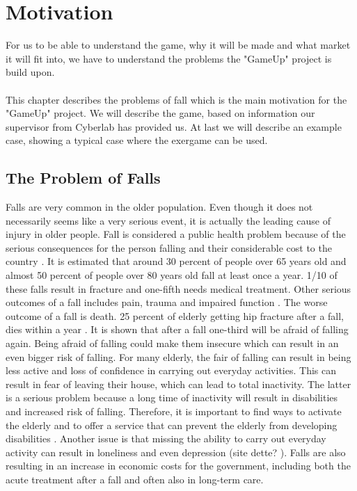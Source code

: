 \chapter{Motivation}
For us to be able to understand the game, why it will be made and what market it will fit into, we have to understand the problems the "GameUp" project is build upon.  \\ \\
This chapter describes the problems of fall which is the main motivation for the "GameUp" project. We will describe the game, based on information our supervisor from Cyberlab has provided us. At last we will describe an example case, showing a typical case where the exergame can be used. 
\section{The Problem of Falls}
Falls are very common in the older population. Even though it does not necessarily seems like a very serious event, it is actually the leading cause of injury in older people.  Fall is considered a public health problem because of the serious consequences for the person falling and their considerable cost to the country \cite{otago}.
It is estimated that around 30 percent of people over 65 years old and almost 50 percent of people over 80 years old fall at least once a year. 1/10 of these falls result in fracture and one-fifth needs medical treatment. Other serious outcomes of a fall includes pain, trauma and impaired function \cite{otago}.  The worse outcome of a fall is death. 25 percent of elderly getting hip fracture after a fall, dies within a year \cite{gruppetrening-trheim} \cite{larhalsbrudd}. It is shown that after a fall one-third will be afraid of falling again. Being afraid of falling could make them insecure which can result in an even bigger risk of falling. For many elderly, the fair of falling can result in being less active and loss of confidence in carrying out everyday activities. This can result in fear of leaving their house, which can lead to total inactivity. The latter is a serious problem because a long time of inactivity will result in disabilities and increased risk of falling. Therefore, it is important to find ways to activate the elderly and to offer a service that can prevent the elderly from developing disabilities \cite{gruppetrening-trheim}. Another issue is that missing the ability to carry out everyday activity can result in loneliness and even depression (site dette? ). Falls are also resulting in an increase in economic costs for the government, including both the acute treatment after a fall and often also in long-term care. \cite{otago}\\ \\

